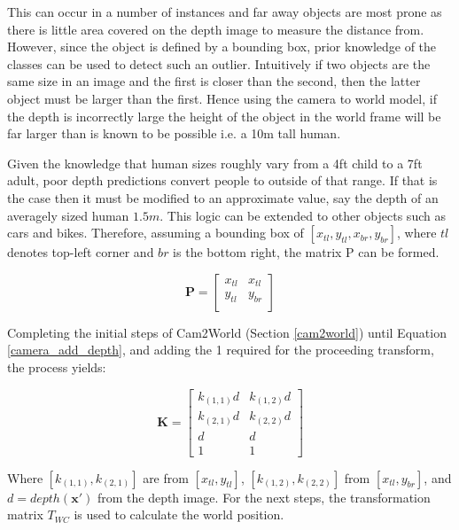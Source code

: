 \documentclass[a4paper,11pt,notitlepage]{article}
\begin{document}
This can occur in a number of instances and far away objects are most prone as there is little area covered on the depth image to measure the distance from. However, since the object is defined by a bounding box, prior knowledge of the classes can be used to detect such an outlier. Intuitively if two objects are the same size in an image and the first is closer than the second, then the latter object must be larger than the first. Hence using the camera to world model, if the depth is incorrectly large the height of the object in the world frame will be far larger than is known to be possible i.e. a 10m tall human.

Given the knowledge that human sizes roughly vary from a 4ft child to a 7ft adult, poor depth predictions convert people to outside of that range. If that is the case then it must be modified to an approximate value, say the depth of an averagely sized human $1.5m$. This logic can be extended to other objects such as cars and bikes. Therefore, assuming a bounding box of $[x_{tl},y_{tl},x_{br},y_{br}]$, where $tl$ denotes top-left corner and $br$ is the bottom right, the matrix P can be formed.

\begin{equation}
\mathbf{P} = 
\begin{bmatrix}
x_{tl} & x_{tl}\\
y_{tl} & y_{br} \\
\end{bmatrix}
\label{check__depth_eq1}
\end{equation}

Completing the initial steps of Cam2World (Section \ref{cam2world}) until Equation \ref{camera_add_depth}, and adding the 1 required for the proceeding transform, the process yields:

\begin{equation}
\mathbf{K} = 
\begin{bmatrix}
k_{(1,1)}\mathit{d} & k_{(1,2)}\mathit{d}\\
k_{(2,1)}\mathit{d} & k_{(2,2)}\mathit{d}\\
\mathit{d} & \mathit{d}\\
1 & 1
\end{bmatrix}
\label{check__depth_eq2}
\end{equation}

Where $[k_{(1,1)},k_{(2,1)}]$ are from $[x_{tl},y_{tl}]$, $[k_{(1,2)}, k_{(2,2)}]$  from $[x_{tl},y_{br}]$, and $\mathit{d} = depth(\mathbf{x'})$ from the depth image. For the next steps, the transformation matrix $T_{WC}$ is used to calculate the world position.
\end{document}
